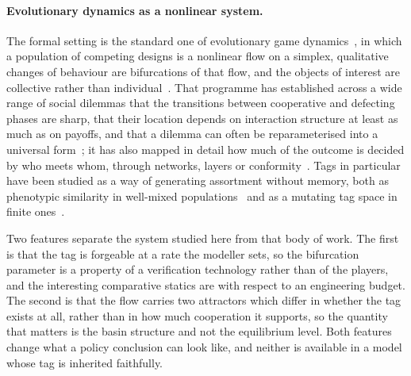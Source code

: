 \paragraph{Evolutionary dynamics as a nonlinear system.}
The formal setting is the standard one of evolutionary game
dynamics~\citep{taylor1978ess,hofbauer1998evolutionary,hofbauer2003evolutionary},
in which a population of competing designs is a nonlinear flow on a simplex,
qualitative changes of behaviour are bifurcations of that flow, and the objects
of interest are collective rather than
individual~\citep{perc2010coevolutionary,perc2017statphys}. That programme has
established across a wide range of social dilemmas that the transitions between
cooperative and defecting phases are sharp, that their location depends on
interaction structure at least as much as on payoffs, and that a dilemma can
often be reparameterised into a universal
form~\citep{perc2016phase,wang2015universal}; it has also mapped in detail how
much of the outcome is decided by who meets whom, through networks, layers or
conformity~\citep{nowak1992spatial,santos2005scale,ohtsuki2006simple,szabo2007evolutionary,wang2015multilayer,szolnoki2015conformity}.
Tags in particular have been studied as a way of generating assortment without
memory, both as phenotypic similarity in well-mixed
populations~\citep{antal2009phenotypic} and as a mutating tag space in finite
ones~\citep{traulsen2007chromodynamics}.

Two features separate the system studied here from that body of work. The first
is that the tag is forgeable at a rate the modeller sets, so the bifurcation
parameter is a property of a verification technology rather than of the
players, and the interesting comparative statics are with respect to an
engineering budget. The second is that the flow carries two attractors which
differ in whether the tag exists at all, rather than in how much cooperation it
supports, so the quantity that matters is the basin structure and not the
equilibrium level. Both features change what a policy conclusion can look like,
and neither is available in a model whose tag is inherited faithfully.

